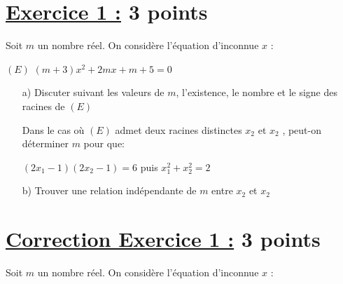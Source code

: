 \documentclass[12pt,a4paper]{article}
\begin{document}
\renewcommand{\arraystretch}{1.5}
\renewcommand{\arrayrulewidth}{1.2pt}
\vspace{3cm}

\section*{\underline{Exercice 1 :} 3 points}
Soit \( m \) un nombre réel. On considère l’équation d’inconnue \( x \) :

\( (E) \) \( (m+3)x^{2} +2mx + m + 5 = 0\)
\begin{enumerate}

\item[a)] Discuter suivant les valeurs de \( m \), l’existence, le nombre et le signe des racines de \( (E) \) 

Dans le cas où \( (E) \) admet deux racines distinctes \( x_{2} \) et \( x_{2} \) , peut-on déterminer \( m \) pour que:

\( ( 2x_{1} - 1 ) (2x_{2}-1) = 6 \) puis \( x_{1}^{2} + x_{2}^{2} = 2 \)

\item[b)]Trouver une relation indépendante de \( m \) entre \( x_{2} \) et \( x_{2} \)
\end{enumerate}
\section*{\underline{Correction Exercice 1 :} 3 points}
Soit \( m \) un nombre réel. On considère l’équation d’inconnue \( x \) :
\end{document}
